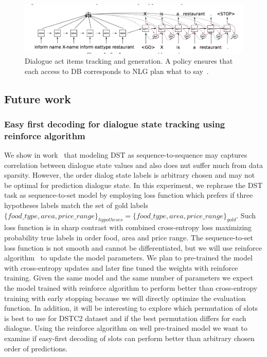 \documentclass[11pt]{article}
\begin{document}
\begin{figure}[htpb]
    \centering
    \includegraphics[width=1.0\linewidth]{dusek_seq2seq}
    \caption{Dialogue act items tracking and generation. A policy ensures that each access to DB corresponds to NLG plan what to say~\cite{dusek_sequence2sequence_2016}.}
    \label{fig:dai_gen}
\end{figure}

\subsection{Future work}

\subsubsection*{Easy first decoding for dialogue state tracking using reinforce algorithm}
We show in work~\cite{platek_recurrent_2016} that modeling DST as sequence-to-sequence may captures correlation between dialogue state values and also does nut suffer much from data sparsity.
However, the order dialog state labels is arbitrary chosen and may not be optimal for prediction dialogue state.
In this experiment, we rephrase the DST task as sequence-to-set model by employing loss function which prefers if three hypotheses labels match the set of gold labels $\{food\_type, area, price\_range\}_{hypotheses} = \{food\_type, area, price\_range\}_{gold}$.
Such loss function is in sharp contrast with combined cross-entropy loss maximizing probability true labels in order food, area and price range.
The sequence-to-set loss function is not smooth and cannot be differentiated, but we will use reinforce algorithm~\cite{williams_simple_1992} to update the model parameters.
We plan to pre-trained the model with cross-entropy updates and later fine tuned the weights with reinforce training.
Given the same model and the same number of parameters we expect the model trained with reinforce algorithm to perform better than cross-entropy training with early stopping because we will directly optimize the evaluation function.
In addition, it will be interesting to explore which permutation of slots is best to use for DSTC2 dataset and if the best permutation differs for each dialogue.
Using the reinforce algorithm on well pre-trained model we want to examine if easy-first decoding of slots can perform better than arbitrary chosen order of predictions. 
\end{document}
